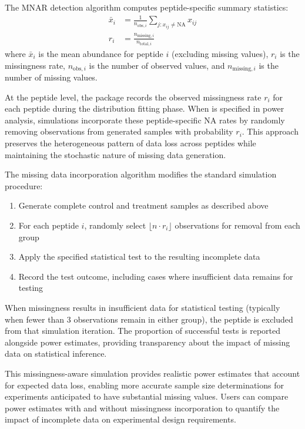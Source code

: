 \documentclass[article]{jss}
\begin{document}
The MNAR detection algorithm computes peptide-specific summary statistics:
\begin{align}
\bar{x}_i &= \frac{1}{n_{\text{obs},i}} \sum_{j: x_{ij} \neq \text{NA}} x_{ij} \\
r_i &= \frac{n_{\text{missing},i}}{n_{\text{total},i}}
\end{align}
where $\bar{x}_i$ is the mean abundance for peptide $i$ (excluding missing values), $r_i$ is the missingness rate, $n_{\text{obs},i}$ is the number of observed values, and $n_{\text{missing},i}$ is the number of missing values.

At the peptide level, the package records the observed missingness rate $r_i$ for each peptide during the distribution fitting phase. When  is specified in power analysis, simulations incorporate these peptide-specific NA rates by randomly removing observations from generated samples with probability $r_i$. This approach preserves the heterogeneous pattern of data loss across peptides while maintaining the stochastic nature of missing data generation.

The missing data incorporation algorithm modifies the standard simulation procedure:
\begin{enumerate}
\item Generate complete control and treatment samples as described above
\item For each peptide $i$, randomly select $\lfloor n \cdot r_i \rfloor$ observations for removal from each group
\item Apply the specified statistical test to the resulting incomplete data
\item Record the test outcome, including cases where insufficient data remains for testing
\end{enumerate}

When missingness results in insufficient data for statistical testing (typically when fewer than 3 observations remain in either group), the peptide is excluded from that simulation iteration. The proportion of successful tests is reported alongside power estimates, providing transparency about the impact of missing data on statistical inference.

This missingness-aware simulation provides realistic power estimates that account for expected data loss, enabling more accurate sample size determinations for experiments anticipated to have substantial missing values. Users can compare power estimates with and without missingness incorporation to quantify the impact of incomplete data on experimental design requirements.
\end{document}
